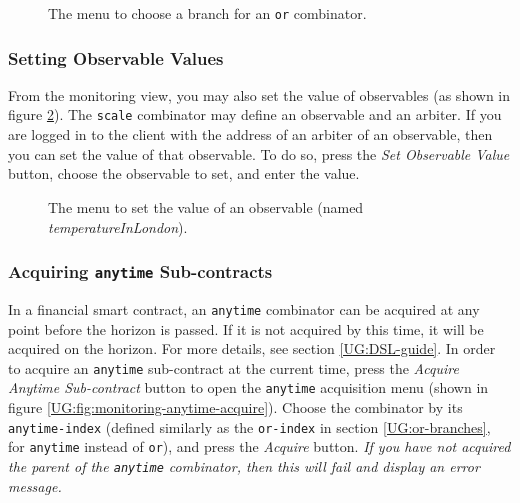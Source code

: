 \documentclass{article}
\begin{document}
\begin{figure}[h]
    \centering
    \caption{The menu to choose a branch for an \texttt{or} combinator.}
    \label{UG:fig:monitoring-or-select}
\end{figure}


\subsubsection{Setting Observable Values}

From the monitoring view, you may also set the value of observables (as shown in figure \ref{UG:fig:monitoring-obs-select}). The \texttt{scale} combinator may define an observable and an arbiter. If you are logged in to the client with the address of an arbiter of an observable, then you can set the value of that observable. To do so, press the \textit{Set Observable Value} button, choose the observable to set, and enter the value.

\begin{figure}[h]
    \centering
    \caption{The menu to set the value of an observable (named \textit{temperatureInLondon}).}
    \label{UG:fig:monitoring-obs-select}
\end{figure}


\subsubsection{Acquiring \texttt{anytime} Sub-contracts}

In a financial smart contract, an \texttt{anytime} combinator can be acquired at any point before the horizon is passed. If it is not acquired by this time, it will be acquired on the horizon. For more details, see section \ref{UG:DSL-guide}. In order to acquire an \texttt{anytime} sub-contract at the current time, press the \textit{Acquire Anytime Sub-contract} button to open the \texttt{anytime} acquisition menu (shown in figure \ref{UG:fig:monitoring-anytime-acquire}). Choose the combinator by its \texttt{anytime-index} (defined similarly as the \texttt{or-index} in section \ref{UG:or-branches}, for \texttt{anytime} instead of \texttt{or}), and press the \textit{Acquire} button. \textit{If you have not acquired the parent of the \texttt{anytime} combinator, then this will fail and display an error message.}
\end{document}
